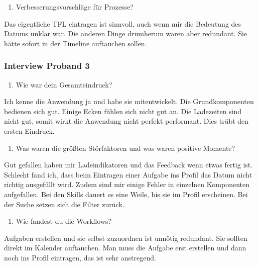 \documentclass[
  12pt,
  ngerman,
  a4paper,
]{article}
\providecommand{\tightlist}{%
  \setlength{\itemsep}{0pt}\setlength{\parskip}{0pt}}
\begin{document}
\begin{enumerate}
\def\labelenumi{\arabic{enumi}.}
\setcounter{enumi}{4}
\tightlist
\item
  Verbesserungsvorschläge für Prozesse?
\end{enumerate}

Das eigentliche TFL eintragen ist sinnvoll, auch wenn mir die Bedeutung
des Datums unklar war. Die anderen Dinge drumherum waren aber redundant.
Sie hätte sofort in der Timeline auftauchen sollen.

\hypertarget{interview-proband-3}{%
\subsubsection{Interview Proband 3}\label{interview-proband-3}}

\begin{enumerate}
\def\labelenumi{\arabic{enumi}.}
\tightlist
\item
  Wie war dein Gesamteindruck?
\end{enumerate}

Ich kenne die Anwendung ja und habe sie mitentwickelt. Die
Grundkomponenten bedienen sich gut. Einige Ecken fühlen sich nicht gut
an. Die Ladezeiten sind nicht gut, somit wirkt die Anwendung nicht
perfekt performant. Dies trübt den ersten Eindruck.

\begin{enumerate}
\def\labelenumi{\arabic{enumi}.}
\setcounter{enumi}{1}
\tightlist
\item
  Was waren die größten Störfaktoren und was waren positive Momente?
\end{enumerate}

Gut gefallen haben mir Ladeindikatoren und das Feedback wenn etwas
fertig ist. Schlecht fand ich, dass beim Eintragen einer Aufgabe ins
Profil das Datum nicht richtig ausgefüllt wird. Zudem sind mir einige
Fehler in einzelnen Komponenten aufgefallen. Bei den Skills dauert es
eine Weile, bis sie im Profil erscheinen. Bei der Suche setzen sich die
Filter zurück.

\begin{enumerate}
\def\labelenumi{\arabic{enumi}.}
\setcounter{enumi}{2}
\tightlist
\item
  Wie fandest du die Workflows?
\end{enumerate}

Aufgaben erstellen und sie selbst zuzuordnen ist unnötig redundant. Sie
sollten direkt im Kalender auftauchen. Man muss die Aufgabe erst
erstellen und dann noch ins Profil eintragen, das ist sehr anstregend.
\end{document}
